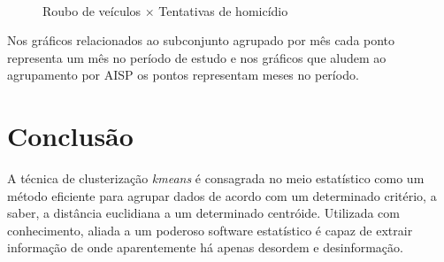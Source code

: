 \documentclass[a4paper, 12pt]{article}\usepackage[]{graphicx}\usepackage[]{color}
\begin{document}
	\begin{figure}[H]
		\centering
		~
		\caption{Roubo de veículos $\times$ Tentativas de homicídio}
		\label{fig:rouboHom}
	\end{figure}
	\begin{multicols}{2}	
		Nos gráficos relacionados ao subconjunto agrupado por mês cada ponto representa um mês no período de estudo e nos gráficos que aludem ao agrupamento por AISP os pontos representam meses no período.  
		
		\section{Conclusão}
		A técnica de clusterização \textit{kmeans} é consagrada no meio estatístico como um método eficiente para agrupar dados de acordo com um determinado critério, a saber, a distância euclidiana a um determinado centróide.  Utilizada com conhecimento, aliada a um poderoso software estatístico é capaz de extrair informação de onde aparentemente há apenas desordem e desinformação.
		
		
		
		
	\end{multicols}
\end{document}
